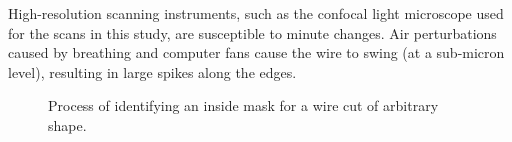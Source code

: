 \documentclass[
  authoryear,
  preprint,
  5p,
  twocolumn]{elsarticle}
\begin{document}
High-resolution scanning instruments, such as the confocal light
microscope used for the scans in this study, are susceptible to minute
changes. Air perturbations caused by breathing and computer fans cause
the wire to swing (at a sub-micron level), resulting in large spikes
along the edges.

\begin{figure}


\caption{\label{fig-find-inside-polygon}Process of identifying an inside
mask for a wire cut of arbitrary shape.}

\end{figure}%
\end{document}
